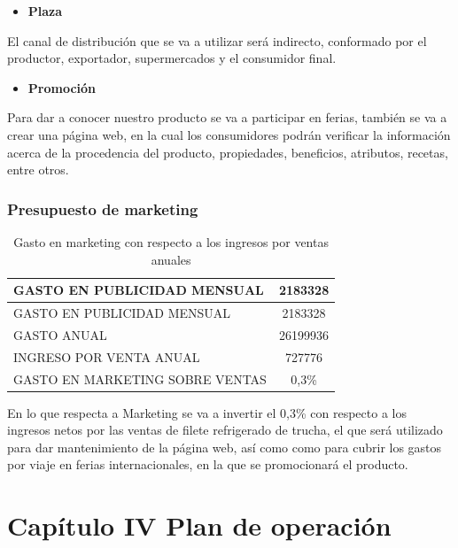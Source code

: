 \documentclass[
  stu,
  floatsintext,
  longtable,
  a4paper,
  nolmodern,
  notxfonts,
  notimes,
  12pt,
  colorlinks=true,linkcolor=blue,citecolor=blue,urlcolor=blue]{apa7}
\providecommand{\tightlist}{%
  \setlength{\itemsep}{0pt}\setlength{\parskip}{0pt}}
\begin{document}
\begin{itemize}
\tightlist
\item
  \textbf{Plaza}
\end{itemize}

El canal de distribución que se va a utilizar será indirecto, conformado
por el productor, exportador, supermercados y el consumidor final.

\begin{itemize}
\tightlist
\item
  \textbf{Promoción}
\end{itemize}

Para dar a conocer nuestro producto se va a participar en ferias,
también se va a crear una página web, en la cual los consumidores podrán
verificar la información acerca de la procedencia del producto,
propiedades, beneficios, atributos, recetas, entre otros.

\subsubsection{Presupuesto de marketing}\label{presupuesto-de-marketing}

\begin{longtable}[]{@{}lc@{}}
\caption{Gasto en marketing con respecto a los ingresos por ventas
anuales}\tabularnewline
\toprule\noalign{}
GASTO EN PUBLICIDAD MENSUAL & 2183328 \\
\midrule\noalign{}
\endfirsthead
\toprule\noalign{}
GASTO EN PUBLICIDAD MENSUAL & 2183328 \\
\midrule\noalign{}
\endhead
\bottomrule\noalign{}
\endlastfoot
GASTO ANUAL & 26199936 \\
INGRESO POR VENTA ANUAL & 727776 \\
GASTO EN MARKETING SOBRE VENTAS & 0,3\% \\
\end{longtable}

En lo que respecta a Marketing se va a invertir el 0,3\% con respecto a
los ingresos netos por las ventas de filete refrigerado de trucha, el
que será utilizado para dar mantenimiento de la página web, así como
como para cubrir los gastos por viaje en ferias internacionales, en la
que se promocionará el producto.

\section{Capítulo IV Plan de
operación}\label{capuxedtulo-iv-plan-de-operaciuxf3n}
\end{document}
